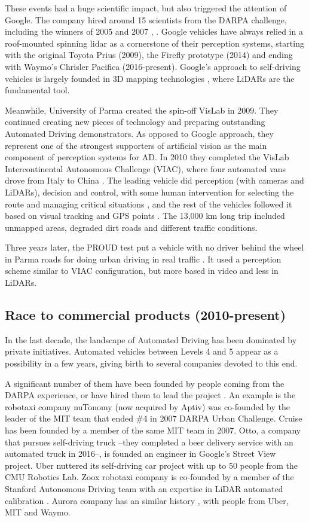These events had a huge scientific impact, but also triggered the attention of 
Google. The company hired around 15 scientists from the DARPA challenge, 
including the winners of 2005 and 2007 \cite{Montemerlo2008}, 
\cite{Levinson2011}. Google vehicles have always relied in a roof-mounted 
spinning lidar as a cornerstone of their perception systems, starting with the 
original Toyota Prius (2009), the Firefly prototype (2014) and ending with 
Waymo's Chrisler Pacifica (2016-present).
Google's approach to self-driving vehicles is largely founded in 3D mapping technologies \cite{Chapell2016}, where LiDARs are the fundamental tool.

Meanwhile, University of Parma created the spin-off VisLab in 2009. They 
continued creating new pieces of technology and preparing outstanding Automated 
Driving demonstrators. As opposed to Google approach, they represent one of the 
strongest supporters of artificial vision as the main component of perception 
systems for AD. In 2010 they completed the VisLab Intercontinental Autonomous 
Challenge (VIAC), where four automated vans drove from Italy to China 
\cite{Bertozzi2011}.
The leading vehicle did perception (with cameras and LiDARs), decision and 
control, with some human intervention for selecting the route and managing 
critical situations \cite{Broggi2012a}, and the rest of the vehicles followed 
it based on visual tracking and GPS points \cite{Broggi2012a}. The 13,000 km 
long trip included unmapped areas, degraded dirt roads and different traffic 
conditions. 

Three years later, the PROUD test put a vehicle with no driver behind the wheel in Parma roads for doing urban driving in real traffic \cite{Broggi2013}. It used a perception scheme similar to VIAC configuration, but more based in video and less in LiDARs.
 
\subsection{Race to commercial products (2010-present)}
 
In the last decade, the landscape of Automated Driving has been dominated by private initiatives. Automated vehicles between Levels 4 and 5 appear as a possibility in a few years, giving birth to several companies devoted to this end. 

A significant number of them have been founded by people coming from the DARPA experience, or have hired them to lead the project \cite{Chapell2016}. An example is the robotaxi company nuTonomy (now acquired by Aptiv) was co-founded by the leader of the MIT team that ended \#4 in 2007 DARPA Urban Challenge.
Cruise has been founded by a member of the same MIT team in 2007. Otto, a 
company that pursues self-driving truck --they completed a beer delivery 
service with an automated truck in 2016--, is founded an engineer in Google's 
Street View project.
Uber nuttered its self-driving car project with up to 50 people from the CMU 
Robotics Lab. Zoox robotaxi company is co-founded by a member of the Stanford 
Autonomous Driving team with an expertise in LiDAR automated calibration 
\cite{Levinson2011a}. Aurora company has an similar history 
\cite{Anderson2013}, with people from Uber, MIT and Waymo. 

